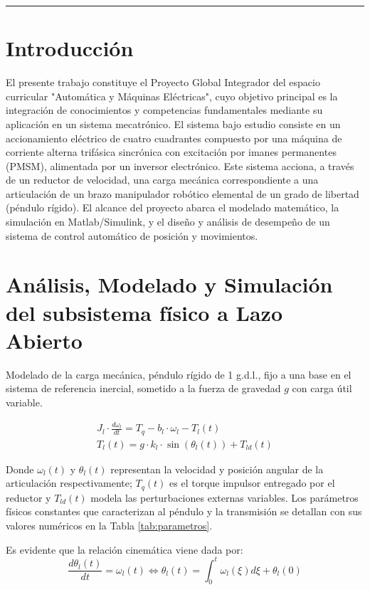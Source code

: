 \documentclass[12pt, a4paper,journal, onecolumn, compsoc]{IEEEtran}
\begin{document}
\vspace{4pt}
\noindent\rule{\textwidth}{0.4pt}

\section{Introducción}
El presente trabajo constituye el Proyecto Global Integrador del espacio curricular "Automática y Máquinas Eléctricas", cuyo objetivo principal es la integración de conocimientos y competencias fundamentales mediante su aplicación en un sistema mecatrónico.
El sistema bajo estudio consiste en un accionamiento eléctrico de cuatro cuadrantes compuesto por una máquina de corriente alterna trifásica sincrónica con excitación por imanes permanentes (PMSM), alimentada por un inversor electrónico. Este sistema acciona, a través de un reductor de velocidad, una carga mecánica correspondiente a una articulación de un brazo manipulador robótico elemental de un grado de libertad (péndulo rígido).
El alcance del proyecto abarca el modelado matemático, la simulación en Matlab/Simulink, y el diseño y análisis de desempeño de un sistema de control automático de posición y movimientos.

\section{Análisis, Modelado y Simulación del subsistema físico a Lazo Abierto}
Modelado de la carga mecánica, péndulo rígido de 1 g.d.l., fijo a una base en el sistema de referencia inercial, sometido a la fuerza de gravedad \(g\) con carga útil variable.

\begin{align}
    J_l\cdot \frac{d\omega_l}{dt} = T_q - b_l\cdot \omega_l - T_l(t)  \\
    T_l(t) = g\cdot k_l \cdot \sin(\theta_l(t)) + T_{ld}(t)
\end{align}

Donde $\omega_l(t)$ y $\theta_l(t)$ representan la velocidad y posición angular de la articulación respectivamente; $T_q(t)$ es el torque impulsor entregado por el reductor y $T_{ld}(t)$ modela las perturbaciones externas variables. Los parámetros físicos constantes que caracterizan al péndulo y la transmisión se detallan con sus valores numéricos en la Tabla \ref{tab:parametros}.

Es evidente que la relación cinemática viene dada por:
\[
    \frac{d\theta_l(t)}{dt} = \omega_l(t) \Leftrightarrow \theta_l(t) = \int_0^t{\omega_l(\xi)d\xi + \theta_l(0)}
\]
\end{document}
